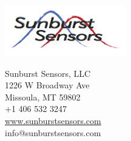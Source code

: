\documentclass[twoside,letterpaper]{article}
\begin{document}
\begin{titlepage}
\begin{nolinenumbers}
        \begingroup
            \centering
			\begin{minipage}[b]{0.5\hsize}
			\raggedright
			\includegraphics[scale=0.7]{figs/SBlogo.jpg}
			\end{minipage}
			\noindent
			\begin{minipage}[b]{0.5\hsize}
			\raggedleft
			\small
            
			Sunburst Sensors, LLC\\
			1226 W Broadway Ave\\
			Missoula, MT 59802\\
			+1 406 532 3247\\
            \url{www.sunburstsensors.com}\\
            info@sunburstsensors.com\\
			\end{minipage}
        \endgroup
			
		\end{nolinenumbers}
\end{titlepage}
\restoregeometry

\newpage\null\thispagestyle{empty}\newpage
\newpage\null\thispagestyle{empty}\newpage

{\protect\thispagestyle{empty}}
\tableofcontents
{\protect\thispagestyle{empty}}
\cleardoublepage
\newpage\null\thispagestyle{empty}\newpage
\newpage\null\thispagestyle{empty}\newpage

\setcounter{page}{1}



\cleardoublepage\thispagestyle{empty}

\cleardoublepage\thispagestyle{empty}

\cleardoublepage\thispagestyle{empty}

\cleardoublepage\thispagestyle{empty}

\cleardoublepage\thispagestyle{empty}

\cleardoublepage\thispagestyle{empty}

\cleardoublepage\thispagestyle{empty}

\cleardoublepage\thispagestyle{empty}

\cleardoublepage\thispagestyle{empty}

\end{document}
